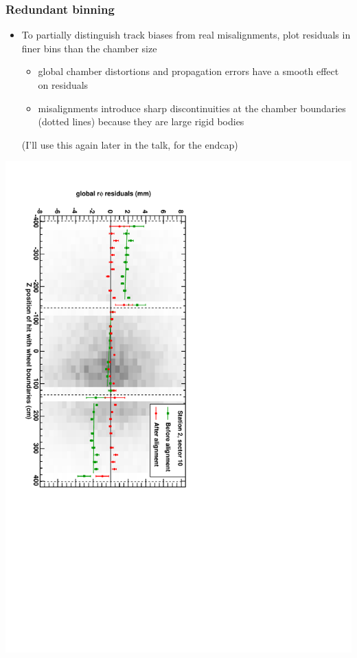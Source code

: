 \documentclass[compress]{beamer}
\begin{document}
\begin{frame}
\frametitle{Redundant binning}
\begin{itemize}
\item To partially distinguish track biases from real misalignments,
  plot residuals in finer bins than the chamber size
\begin{itemize}
\item global chamber distortions and propagation errors have a smooth
  effect on residuals
\item misalignments introduce sharp discontinuities at the chamber
  boundaries (dotted lines) because they are large rigid bodies
\end{itemize}

{(I'll use this again later in the talk, for the endcap)}
\end{itemize}
\begin{center}
\includegraphics[height=0.75\linewidth, angle=90]{example_mapplot4.pdf}
\end{center}
\end{frame}
\end{document}
